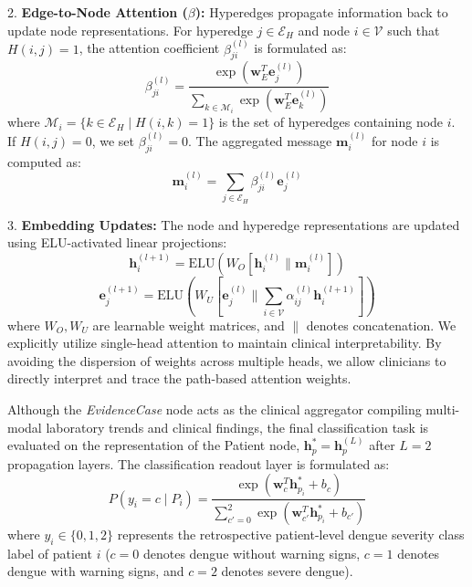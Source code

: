 \documentclass[conference]{IEEEtran}
\begin{document}
2. \textbf{Edge-to-Node Attention ($\beta$):} Hyperedges propagate information back to update node representations. For hyperedge $j \in \mathcal{E}_H$ and node $i \in \mathcal{V}$ such that $H(i,j)=1$, the attention coefficient $\beta_{ji}^{(l)}$ is formulated as:
\begin{equation}
    \beta_{ji}^{(l)} = \frac{\exp(\mathbf{w}_E^T \mathbf{e}_j^{(l)})}{\sum_{k \in \mathcal{M}_i} \exp(\mathbf{w}_E^T \mathbf{e}_k^{(l)})}
\end{equation}
where $\mathcal{M}_i = \{k \in \mathcal{E}_H \mid H(i,k) = 1\}$ is the set of hyperedges containing node $i$. If $H(i,j)=0$, we set $\beta_{ji}^{(l)} = 0$. The aggregated message $\mathbf{m}_i^{(l)}$ for node $i$ is computed as:
\begin{equation}
    \mathbf{m}_i^{(l)} = \sum_{j \in \mathcal{E}_H} \beta_{ji}^{(l)} \mathbf{e}_j^{(l)}
\end{equation}

3. \textbf{Embedding Updates:} The node and hyperedge representations are updated using ELU-activated linear projections:
\begin{equation}
    \mathbf{h}_i^{(l+1)} = \text{ELU}(W_O [\mathbf{h}_i^{(l)} \| \mathbf{m}_i^{(l)}])
\end{equation}
\begin{equation}
    \mathbf{e}_j^{(l+1)} = \text{ELU}(W_U [\mathbf{e}_j^{(l)} \| \sum_{i \in \mathcal{V}} \alpha_{ij}^{(l)} \mathbf{h}_i^{(l+1)}])
\end{equation}
where $W_O, W_U$ are learnable weight matrices, and $\|$ denotes concatenation. We explicitly utilize single-head attention to maintain clinical interpretability. By avoiding the dispersion of weights across multiple heads, we allow clinicians to directly interpret and trace the path-based attention weights.

Although the \textit{EvidenceCase} node acts as the clinical aggregator compiling multi-modal laboratory trends and clinical findings, the final classification task is evaluated on the representation of the Patient node, $\mathbf{h}_p^* = \mathbf{h}_p^{(L)}$ after $L=2$ propagation layers. The classification readout layer is formulated as:
\begin{equation}
    P(y_i = c \mid P_i) = \frac{\exp(\mathbf{w}_c^T \mathbf{h}_{p_i}^* + b_c)}{\sum_{c'=0}^2 \exp(\mathbf{w}_{c'}^T \mathbf{h}_{p_i}^* + b_{c'})}
\end{equation}
where $y_i \in \{0, 1, 2\}$ represents the retrospective patient-level dengue severity class label of patient $i$ ($c=0$ denotes dengue without warning signs, $c=1$ denotes dengue with warning signs, and $c=2$ denotes severe dengue).
\end{document}
